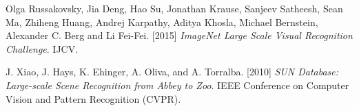\begin{thebibliography}{99}

	\bigskip
	
	Olga Russakovsky, Jia Deng, Hao Su, Jonathan Krause, Sanjeev Satheesh, 
	Sean Ma, Zhiheng Huang, Andrej Karpathy, Aditya Khosla, Michael Bernstein, 
	Alexander C. Berg and Li Fei-Fei. [2015] \textit{ImageNet Large Scale
	 Visual Recognition Challenge}. IJCV.
	 
	 J. Xiao, J. Hays, K. Ehinger, A. Oliva, and A. Torralba. [2010]
	 \textit{SUN Database: Large-scale Scene Recognition from Abbey to Zoo}.
	 IEEE Conference on Computer Vision and Pattern Recognition (CVPR).
	
\end{thebibliography}
